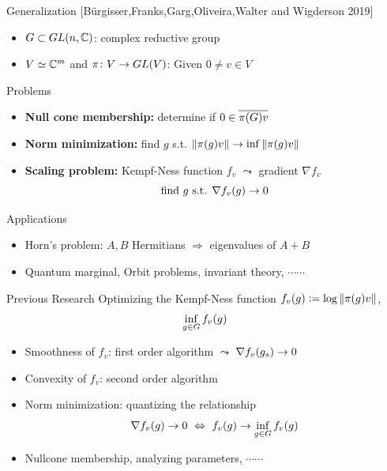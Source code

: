 \documentclass{beamer}
\begin{document}
	\begin{frame}{Generalization\nocite{key8} [{\small B{\"u}rgisser,Franks,Garg,Oliveira,Walter and Wigderson 2019}]}
		\begin{itemize}
			\item $G \subset GL(n,\mathbb{C})$: complex reductive group
			\item $V \simeq \mathbb{C}^m$ and $\pi \colon V \rightarrow GL(V)$: Given $0 \neq v \in V$
		\end{itemize}
		\begin{block}{Problems}
			\begin{itemize}
				\item \textbf{Null cone membership:} determine if $0 \in \overline{\pi(G)v}$
				\item \textbf{Norm minimization:} find $g$ s.t. $\left\lVert\pi(g)v\right\lVert \rightarrow \inf \left\lVert\pi(g)v\right\lVert$
				\item \textbf{Scaling problem:} Kempf-Ness function $f_v$ $\leadsto$ gradient $\nabla f_v$
				\vspace{-0.5em}
				\begin{equation*}
					\text{find } g \text{ s.t. } \nabla f_v(g) \rightarrow 0
				\end{equation*}
			\end{itemize}
		\end{block}
		\begin{block}{Applications}
			\begin{itemize}
				\item Horn’s problem: $A,B$ Hermitians $\Rightarrow$ eigenvalues of $A+B$
				\item Quantum marginal, Orbit problems, invariant theory, $\cdots\cdots$
			\end{itemize}
		\end{block}
	\end{frame}

	\begin{frame}{Previous Research \cite{key8}}
		Optimizing the Kempf-Ness function $f_v(g) \vcentcolon= \log \left\lVert\pi(g)v\right\lVert$,
		\vspace{-0.5em}
		\begin{equation*}
			\inf_{g \in G} f_v(g)
			\vspace{-0.5em}
		\end{equation*}
		\vspace{-0.5em}
		\begin{itemize}
			\item Smoothness of $f_v$: first order algorithm $\leadsto$  $\nabla f_v(g_s) \rightarrow 0$
			\item Convexity of $f_v$: second order algorithm
			\item Norm minimization: quantizing the relationship
			\vspace{-0.5em}
			\begin{equation*}
				\nabla f_v(g) \sto 0 ~\Leftrightarrow~ f_v(g) \sto \inf_{g \in G} f_v(g)
				\vspace{-0.5em}
			\end{equation*}
			\item Nullcone membership, analyzing parameters, $\cdots\cdots$
		\end{itemize}
	\end{frame}
\end{document}
